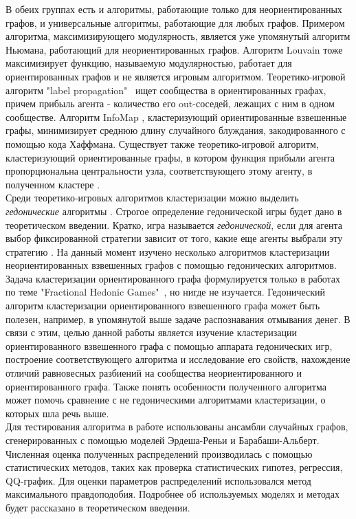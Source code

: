 В обеих группах есть и алгоритмы, работающие только для неориентированных графов, и универсальные алгоритмы, работающие для любых графов. Примером алгоритма, максимизирующего модулярность, является уже упомянутый алгоритм Ньюмана, работающий для неориентированных графов. Алгоритм Louvain тоже максимизирует функцию, называемую модулярностью, работает для ориентированных графов и не является игровым алгоритмом. Теоретико-игровой алгоритм "label propagation"\ \cite{Raghavan} ищет сообщества в ориентированных графах, причем прибыль агента - количество его out-соседей, лежащих с ним в одном сообществе. Алгоритм InfoMap \cite{infomap}, кластеризующий ориентированные взвешенные графы, минимизирует среднюю длину случайного блуждания, закодированного с помощью кода Хаффмана. Существует также теоретико-игровой алгоритм, кластеризующий ориентированные графы, в котором функция прибыли агента пропорциональна центральности узла, соответствующего этому агенту, в полученном кластере \cite{Balliu}.\\

Среди теоретико-игровых алгоритмов кластеризации можно выделить \textit{гедонические} алгоритмы \cite{clusteringhg}. Строгое определение гедонической игры будет дано в теоретическом введении. Кратко, игра называется \textit{гедонической}, если для агента выбор фиксированной стратегии зависит от того, какие еще агенты выбрали эту стратегию \cite{framework}. На данный момент изучено несколько алгоритмов кластеризации неориентированных взвешенных графов \cite{clusteringhg} с помощью гедонических алгоритмов. Задача кластеризации ориентированного графа формулируется только в работах по теме "Fractional Hedonic Games"\ \cite{fhg2017}, но нигде не изучается. Гедонический алгоритм кластеризации ориентированного взвешенного графа может быть полезен, например, в упомянутой выше задаче распознавания отмывания денег. В связи с этим, целью данной работы является изучение кластеризации ориентированного взвешенного графа с помощью аппарата гедонических игр, построение соответствующего алгоритма и исследование его свойств, нахождение отличий равновесных разбиений на сообщества неориентированного и ориентированного графа. Также понять особенности полученного алгоритма может помочь сравнение с не гедоническими алгоритмами кластеризации, о которых шла речь выше.\\

Для тестирования алгоритма в работе использованы ансамбли случайных графов, сгенерированных с помощью моделей Эрдеша-Реньи и Барабаши-Альберт. Численная оценка полученных распределений производилась с помощью статистических методов, таких как проверка статистических гипотез, регрессия, QQ-график. Для оценки параметров распределений использовался метод максимального правдоподобия. Подробнее об используемых моделях и методах будет рассказано в теоретическом введении. 